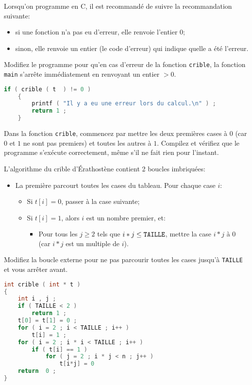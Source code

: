 \question Lorsqu'on programme en C, il est recommandé de suivre la
recommandation suivante:
\begin{itemize}
\item si une fonction n'a pas eu d'erreur, elle renvoie l'entier 0;
\item sinon, elle renvoie un entier (le code d'erreur) qui indique
  quelle a été l'erreur.
\end{itemize}
Modifiez le programme pour qu'en cas d'erreur de la fonction
\texttt{crible}, la fonction \texttt{main} s'arrête immédiatement en
renvoyant un entier \(> 0\).
\begin{solution}
  \begin{lstlisting}[language=C]
    if ( crible ( t  ) != 0 )
    {
        printf ( "Il y a eu une erreur lors du calcul.\n" ) ;
        return 1 ;
    }
  \end{lstlisting}
\end{solution}

\question Dans la fonction \texttt{crible}, commencez par mettre les
deux premières cases à \(0\) (car \(0\) et \(1\) ne sont pas premiers)
et toutes les autres à \(1\). Compilez et vérifiez que le programme
s'exécute correctement, même s'il ne fait rien pour l'instant.

\question L'algorithme du crible d'Érathostène contient 2 boucles imbriquées:
\begin{itemize}
\item La première parcourt toutes les cases du tableau. Pour chaque case \(i\):
  \begin{itemize}
  \item Si \(t[i]=0\), passer à la case suivante;
  \item Si \(t[i]=1\), alors \(i\) est un nombre premier, et:
    \begin{itemize}
    \item Pour tous les \(j\ge 2\) tels que \(i*j\le \text{\tt TAILLE}\), mettre
      la case \(i*j\) à 0 (car \(i*j\) est un multiple de \(i\)).
    \end{itemize}
  \end{itemize}
\end{itemize}

\question Modifiez la boucle externe pour ne pas parcourir toutes les
cases jusqu'à \texttt{TAILLE} et vous arrêter avant. 

\begin{solution}
  \begin{lstlisting}[language=C]
int crible ( int * t )
{
    int i , j ;
    if ( TAILLE < 2 )
        return 1 ;
    t[0] = t[1] = 0 ;
    for ( i = 2 ; i < TAILLE ; i++ )
        t[i] = 1 ;
    for ( i = 2 ; i * i < TAILLE ; i++ )
        if ( t[i] == 1 )
            for ( j = 2 ; i * j < n ; j++ )
                t[i*j] = 0
    return  0 ;
}    
  \end{lstlisting}
\end{solution}


